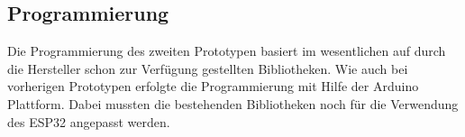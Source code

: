 \subsection{Programmierung} \label{programmierung-subsec}

Die Programmierung des zweiten Prototypen basiert im wesentlichen auf durch die Hersteller schon zur Verfügung gestellten Bibliotheken. Wie auch bei vorherigen Prototypen erfolgte die Programmierung mit Hilfe der Arduino Plattform. Dabei mussten die bestehenden Bibliotheken noch für die Verwendung des ESP32 angepasst werden.



